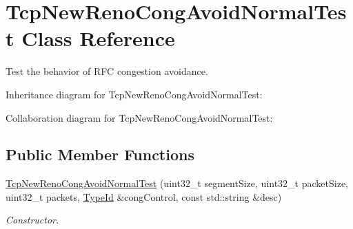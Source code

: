 \hypertarget{classTcpNewRenoCongAvoidNormalTest}{}\section{Tcp\+New\+Reno\+Cong\+Avoid\+Normal\+Test Class Reference}
\label{classTcpNewRenoCongAvoidNormalTest}


Test the behavior of R\+FC congestion avoidance.  




Inheritance diagram for Tcp\+New\+Reno\+Cong\+Avoid\+Normal\+Test\+:


Collaboration diagram for Tcp\+New\+Reno\+Cong\+Avoid\+Normal\+Test\+:
\subsection*{Public Member Functions}
\begin{DoxyCompactItemize}
\item 
\hyperlink{classTcpNewRenoCongAvoidNormalTest_a69753a98ad66415c4d17c67f95fe9dbe}{Tcp\+New\+Reno\+Cong\+Avoid\+Normal\+Test} (uint32\+\_\+t segment\+Size, uint32\+\_\+t packet\+Size, uint32\+\_\+t packets, \hyperlink{classns3_1_1TypeId}{Type\+Id} \&cong\+Control, const std\+::string \&desc)
\begin{DoxyCompactList}\small\item\em Constructor. \end{DoxyCompactList}\end{DoxyCompactItemize}
